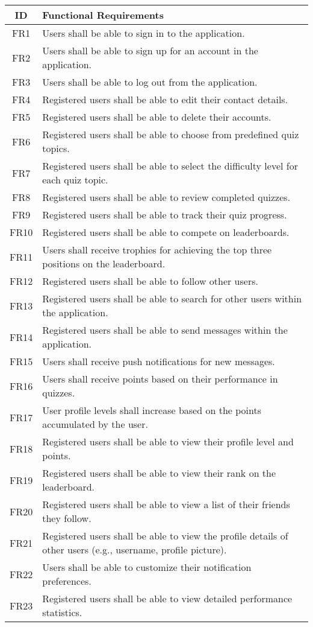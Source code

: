 \begin{longtable}{|c|p{12cm}|}
\hline
\textbf{ID} & \textbf{Functional Requirements} \\
\hline
FR1 & Users shall be able to sign in to the application. \\
\hline
FR2 & Users shall be able to sign up for an account in the application. \\
\hline
FR3 & Users shall be able to log out from the application. \\
\hline
FR4 & Registered users shall be able to edit their contact details. \\
\hline
FR5 & Registered users shall be able to delete their accounts. \\
\hline
FR6 & Registered users shall be able to choose from predefined quiz topics. \\
\hline
FR7 & Registered users shall be able to select the difficulty level for each quiz topic. \\
\hline
FR8 & Registered users shall be able to review completed quizzes. \\
\hline
FR9 & Registered users shall be able to track their quiz progress. \\
\hline
FR10 & Registered users shall be able to compete on leaderboards. \\
\hline
FR11 & Users shall receive trophies for achieving the top three positions on the leaderboard. \\
\hline
FR12 & Registered users shall be able to follow other users. \\
\hline
FR13 & Registered users shall be able to search for other users within the application. \\
\hline
FR14 & Registered users shall be able to send messages within the application. \\
\hline
FR15 & Users shall receive push notifications for new messages. \\
\hline
FR16 & Users shall receive points based on their performance in quizzes. \\
\hline
FR17 & User profile levels shall increase based on the points accumulated by the user. \\
\hline
FR18 & Registered users shall be able to view their profile level and points. \\
\hline
FR19 & Registered users shall be able to view their rank on the leaderboard. \\
\hline
FR20 & Registered users shall be able to view a list of their friends they follow. \\
\hline
FR21 & Registered users shall be able to view the profile details of other users (e.g., username, profile picture). \\
\hline
FR22 & Users shall be able to customize their notification preferences. \\
\hline
FR23 & Registered users shall be able to view detailed performance statistics. \\
\hline
\end{longtable}

